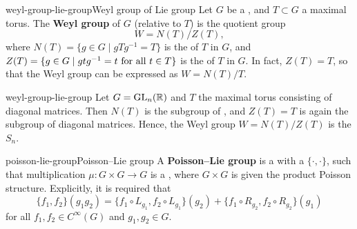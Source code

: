 \begin{topic}{weyl-group-lie-group}{Weyl group of Lie group}
    Let $G$ be a   , and $T \subset G$ a maximal torus. The \textbf{Weyl group} of $G$ (relative to $T$) is the quotient group
    \[ W = N(T) / Z(T) , \]
    where $N(T) = \{ g \in G \mid gTg^{-1} = T \}$ is the  of $T$ in $G$, and $Z(T) = \{ g \in G \mid gtg^{-1} = t \textup{ for all } t \in T \}$ is the  of $T$ in $G$. In fact, $Z(T) = T$, so that the Weyl group can be expressed as $W = N(T) / T$.
\end{topic}

\begin{example}{weyl-group-lie-group}
    Let $G = \textup{GL}_n(\mathbb{R})$ and $T$ the maximal torus consisting of diagonal matrices. Then $N(T)$ is the subgroup of , and $Z(T) = T$ is again the subgroup of diagonal matrices. Hence, the Weyl group $W = N(T)/Z(T)$ is the  $S_n$.
\end{example}

\begin{topic}{poisson-lie-group}{Poisson--Lie group}
    A \textbf{Poisson--Lie group} is a  with a  $\{ \cdot, \cdot \}$, such that multiplication $\mu \colon G \times G \to G$ is a , where $G \times G$ is given the product Poisson structure. Explicitly, it is required that
    \[ \{ f_1, f_2 \}(g_1 g_2) = \{ f_1 \circ L_{g_1}, f_2 \circ L_{g_1} \}(g_2) + \{ f_1 \circ R_{g_2}, f_2 \circ R_{g_2} \}(g_1) \]
    for all $f_1, f_2 \in C^\infty(G)$ and $g_1, g_2 \in G$.
\end{topic}

